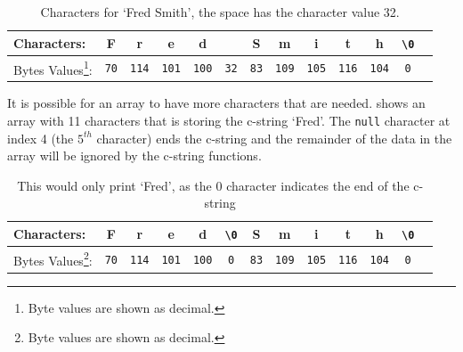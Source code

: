 \begin{table}[h]
\begin{minipage}{\textwidth}
  \centering
\begin{tabular}{|l|c|c|c|c|c|c|c|c|c|c|c|c|}
\hline
Characters: & F & r & e & d &  & S & m & i & t & h & \texttt{\textbackslash 0}\\
\hline
Bytes Values\footnote{Byte values are shown as decimal.}: & \texttt{70} & \texttt{114} & \texttt{101} & \texttt{100} & \texttt{32} & \texttt{83} &\texttt{109} & \texttt{105} & \texttt{116} & \texttt{104} & \texttt{0} \\
\hline
\end{tabular}
\caption{Characters for `Fred Smith', the space has the character value 32.}
\label{tbl:c-string-fred-smith}
\end{minipage}
\end{table}

It is possible for an array to have more characters that are needed.  shows an array with 11 characters that is storing the c-string `Fred'. The \texttt{null} character at index 4 (the $5^{th}$ character) ends the c-string and the remainder of the data in the array will be ignored by the c-string functions.

\begin{table}[h]
\begin{minipage}{\textwidth}
  \centering
\begin{tabular}{|l|c|c|c|c|c|c|c|c|c|c|c|c|}
\hline
Characters: & F & r & e & d & \texttt{\textbackslash 0} & S & m & i & t & h & \texttt{\textbackslash 0}\\
\hline
Bytes Values\footnote{Byte values are shown as decimal.}: & \texttt{70} & \texttt{114} & \texttt{101} & \texttt{100} & \texttt{0} & \texttt{83} &\texttt{109} & \texttt{105} & \texttt{116} & \texttt{104} & \texttt{0} \\
\hline
\end{tabular}
\caption{This would only print `Fred', as the 0 character indicates the end of the c-string}
\label{tbl:c-string-fred-null-smith}
\end{minipage}
\end{table}

